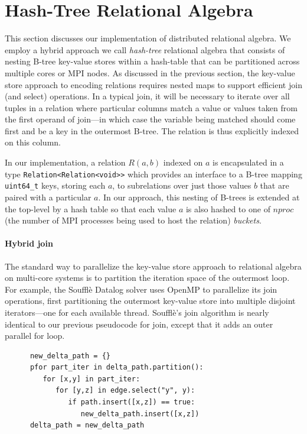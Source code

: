 

\section{Hash-Tree Relational Algebra}
\label{sec:impl}
%
This section discusses our implementation of distributed relational algebra. We employ a hybrid approach we call \emph{hash-tree} relational algebra that consists of nesting B-tree key-value stores within a hash-table that can be partitioned across multiple cores or MPI nodes. As discussed in the previous section, the key-value store approach to encoding relations requires nested maps to support efficient join (and select) operations. In a typical join, it will be necessary to iterate over all tuples in a relation where particular columns match a value or values taken from the first operand of join---in which case the variable being matched should come first and be a key in the outermost B-tree. The relation is thus explicitly indexed on this column.

In our implementation, a relation $R(a,b)$ indexed on $a$ is encapsulated in a type \texttt{Relation<Relation<void>>} which provides an interface to a B-tree mapping \texttt{uint64\_t} keys, storing each $a$, to subrelations over just those values $b$ that are paired with a particular $a$. In our approach, this nesting of B-trees is extended at the top-level by a hash table so that each value $a$ is also hashed to one of $\mathit{nproc}$ (the number of MPI processes being used to host the relation) \textit{buckets}.

\paragraph{Hybrid join} The standard way to parallelize the key-value store approach to relational algebra on multi-core systems is to partition the iteration space of the outermost loop. For example, the Souffl\`e Datalog solver uses OpenMP to parallelize its join operations, first partitioning the outermost key-value store into multiple disjoint iterators---one for each available thread. Souffl\`e's join algorithm is nearly identical to our previous pseudocode for join, except that it adds an outer parallel for loop.   

\begin{verbatim}
      new_delta_path = {}
      pfor part_iter in delta_path.partition():
         for [x,y] in part_iter:
            for [y,z] in edge.select("y", y):
               if path.insert([x,z]) == true:
                  new_delta_path.insert([x,z])
      delta_path = new_delta_path   
\end{verbatim}



